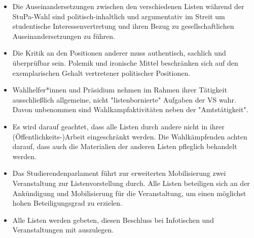 \documentclass[ngerman,headheight=70pt]{scrartcl}
\begin{document}
    \begin{itemize}
        \item Die Auseinandersetzungen zwischen den verschiedenen Listen während
            der StuPa-Wahl sind politisch-inhaltlich und argumentativ im Streit um
            studentische Interessenvertretung und ihren Bezug zu gesellschaftlichen
            Auseinandersetzungen zu führen.
        \item Die Kritik an den Positionen anderer muss authentisch, sachlich und
            überprüfbar sein. Polemik und ironische Mittel beschränken sich auf
            den exemplarischen Gehalt vertretener politischer Positionen.
        \item Wahlhelfer*innen und Präsidium nehmen im Rahmen ihrer Tätigkeit
            ausschließlich allgemeine, nicht "listenbornierte" Aufgaben der VS
            wahr. Davon unbenommen sind Wahlkampfaktivitäten neben der
            "Amtstätigkeit".
        \item Es wird darauf geachtet, dass alle Listen durch andere nicht in
            ihrer (Öffentlichkeits-)Arbeit eingeschränkt werden. Die Wahlkämpfenden
            achten darauf, dass auch die Materialien der anderen Listen pfleglich
            behandelt werden.
        \item Das Studierendenparlament führt zur erweiterten Mobilisierung zwei
            Veranstaltung zur Listenvorstellung durch. Alle Listen beteiligen sich
            an der Ankündigung und Mobilisierung für die Veranstaltung, um einen
            möglichst hohen Beteiligungsgrad zu erzielen.
        \item Alle Listen werden gebeten, diesen Beschluss bei Infotischen und
            Veranstaltungen mit auszulegen.
    \end{itemize}
\end{document}
